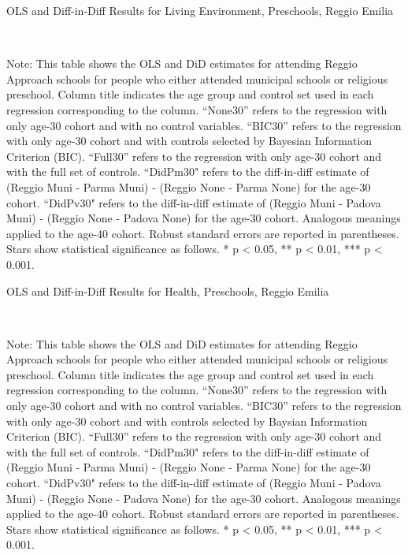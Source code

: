 \begin{landscape}
\begin{table}[H] \caption{OLS and Diff-in-Diff Results for Living Environment, Preschools, Reggio Emilia} \label{ols-L-reg}
\scalebox{0.85}{
}
\vspace{1ex} \\
\footnotesize\raggedright{Note: This table shows the OLS and DiD estimates for attending Reggio Approach schools for people who either attended municipal schools or religious preschool. Column title indicates the age group and control set used in each regression corresponding to the column. ``None30'' refers to the regression with only age-30 cohort and with no control variables. ``BIC30'' refers to the regression with only age-30 cohort and with controls selected by Bayesian Information Criterion (BIC). ``Full30'' refers to the regression with only age-30 cohort and with the full set of controls. ``DidPm30" refers to the diff-in-diff estimate of (Reggio Muni - Parma Muni) - (Reggio None - Parma None) for the age-30 cohort. ``DidPv30" refers to the diff-in-diff estimate of (Reggio Muni - Padova Muni) - (Reggio None - Padova None) for the age-30 cohort. Analogous meanings applied to the age-40 cohort. Robust standard errors are reported in parentheses. Stars show statistical significance as follows. * p < 0.05, ** p < 0.01, *** p < 0.001.}
\end{table}


\begin{table}[H] \caption{OLS and Diff-in-Diff Results for Health, Preschools, Reggio Emilia} \label{ols-H-reg}
\scalebox{0.85}{
}
\vspace{1ex} \\
\footnotesize\raggedright{Note: This table shows the OLS and DiD estimates for attending Reggio Approach schools for people who either attended municipal schools or religious preschool. Column title indicates the age group and control set used in each regression corresponding to the column. ``None30'' refers to the regression with only age-30 cohort and with no control variables. ``BIC30'' refers to the regression with only age-30 cohort and with controls selected by Baysian Information Criterion (BIC). ``Full30'' refers to the regression with only age-30 cohort and with the full set of controls. ``DidPm30" refers to the diff-in-diff estimate of (Reggio Muni - Parma Muni) - (Reggio None - Parma None) for the age-30 cohort. ``DidPv30" refers to the diff-in-diff estimate of (Reggio Muni - Padova Muni) - (Reggio None - Padova None) for the age-30 cohort. Analogous meanings applied to the age-40 cohort. Robust standard errors are reported in parentheses. Stars show statistical significance as follows. * p < 0.05, ** p < 0.01, *** p < 0.001.}
\end{table}


\end{landscape}
